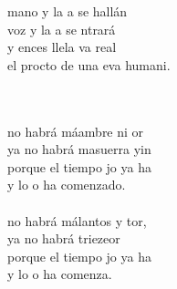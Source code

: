 \begin{cancion}%
	\begin{chorus}%
	 mano y la a se hallán\\
	 voz y la a se ntrará\\
	y ences llela va real\\
	el procto de una eva humani.\\
	\end{chorus}%
	\jump\\
	  \\
	no habrá máambre ni or\\
	ya no habrá masuerra yin\\
	porque el tiempo jo ya ha \\
	y lo o ha comenzado.\\
\jump\\
	no habrá málantos y tor, \\
	ya no habrá triezeor\\
	porque el tiempo jo ya ha \\
	y lo o ha comenza.\\
\end{cancion}%
